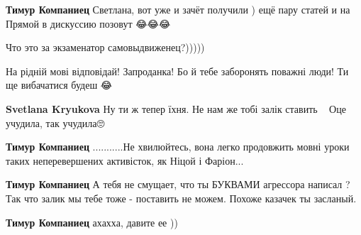 \begin{itemize}
\begin{itemize}
\textbf{Тимур Компаниец} Светлана, вот уже и зачёт получили ) ещё пару статей и на Прямой в дискуссию позовут 😂😂😂

 
Что это за экзаменатор самовыдвиженец?)))))

 
На рідній мові відповідай! Запроданка! Бо й тебе заборонять поважні люди! Ти ще вибачатися будеш 😂

 
\textbf{Svetlana Kryukova} Ну ти ж тепер їхня. Не нам же тобі залік ставить🤣🤣🤣 Оце учудила, так учудила🙄

 
\textbf{Тимур Компаниец} ...........Не хвилюйтесь, вона легко продовжить мовні уроки таких неперевершених активісток, як Ніцой і Фаріон...

 
\textbf{Тимур Компаниец} А тебя не смущает, что ты БУКВАМИ агрессора написал ? Так что залик мы тебе тоже - поставить не можем. Похоже казачек ты засланый.

 
\textbf{Тимур Компаниец} ахахха, давите ее ))


\end{itemize}
\end{itemize}
